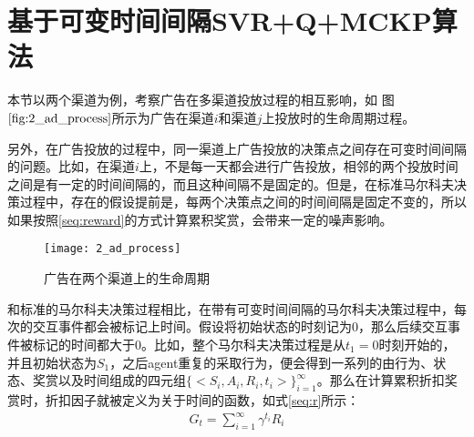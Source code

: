 \section{基于可变时间间隔SVR+Q+MCKP算法}
本节以两个渠道为例，考察广告在多渠道投放过程的相互影响，如
图$\ref{fig:2_ad_process}$所示为广告在渠道$i$和渠道$j$上投放时的生命周期过程。


另外，在广告投放的过程中，同一渠道上广告投放的决策点之间存在可变时间间隔的问题。比如，在渠道$i$上，不是每一天都会进行广告投放，相邻的两个投放时间之间是有一定的时间间隔的，而且这种间隔不是固定的。但是，在标准马尔科夫决策过程中，存在的假设提前是，每两个决策点之间的时间间隔是固定不变的，所以如果按照\eqref{seq:reward}的方式计算累积奖赏，会带来一定的噪声影响。

\begin{figure}[htbp]
\centering
\texttt{[image: 2\_ad\_process]}
\caption{广告在两个渠道上的生命周期}
\label{fig:2_ad_process}
\end{figure}

和标准的马尔科夫决策过程相比，在带有可变时间间隔的马尔科夫决策过程中，每次的交互事件都会被标记上时间。假设将初始状态的时刻记为0，那么后续交互事件被标记的时间都大于0。比如，整个马尔科夫决策过程是从$t_{1}=0$时刻开始的，并且初始状态为$S_{1}$，之后agent重复的采取行为，便会得到一系列的由行为、状态、奖赏以及时间组成的四元组$\{<S_{i},A_{i},R_{i},t_{i}>\}_{i=1}^{\infty}$。那么在计算累积折扣奖赏时，折扣因子就被定义为关于时间的函数，如式\eqref{seq:r}所示：
\begin{equation}\label{seq:r}
\begin{aligned}
G_{t}=\sum_{i=1}^{\infty} \gamma^{t_{i}}R_{i}
\end{aligned}
\end{equation}

